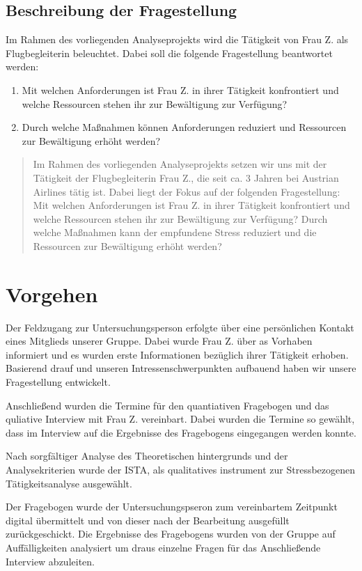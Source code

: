 \documentclass[12pt, a4paper]{article}
\begin{document}
\subsection{Beschreibung der Fragestellung}

Im Rahmen des vorliegenden Analyseprojekts wird die Tätigkeit von Frau Z. als Flugbegleiterin beleuchtet. 
Dabei soll die folgende Fragestellung beantwortet werden:
\begin{enumerate}
    \item Mit welchen Anforderungen ist Frau Z. in ihrer Tätigkeit konfrontiert und
    welche Ressourcen stehen ihr zur Bewältigung zur Verfügung?
    \item Durch welche Maßnahmen können Anforderungen 
    reduziert und Ressourcen zur Bewältigung erhöht werden? 
\end{enumerate}
 
\blockquote{
\tiny
Im Rahmen des vorliegenden Analyseprojekts setzen wir uns mit der Tätigkeit der Flugbegleiterin 
Frau Z., die seit ca. 3 Jahren bei Austrian Airlines tätig ist. Dabei liegt der Fokus auf der folgenden 
Fragestellung:
Mit welchen Anforderungen ist Frau Z. in ihrer Tätigkeit konfrontiert und
welche Ressourcen stehen ihr zur Bewältigung zur Verfügung? Durch welche Maßnahmen kann der empfundene 
Stress reduziert und die Ressourcen zur Bewältigung erhöht werden? }

\section{Vorgehen}

Der Feldzugang zur Untersuchungsperson erfolgte über eine persönlichen Kontakt eines Mitglieds 
unserer Gruppe. Dabei wurde Frau Z. über as Vorhaben informiert und 
es wurden erste Informationen bezüglich ihrer Tätigkeit erhoben. Basierend drauf und 
unseren Intressenschwerpunkten aufbauend haben wir unsere Fragestellung entwickelt. 

Anschließend wurden die Termine für den quantiativen Fragebogen und das quliative Interview 
mit Frau Z. vereinbart. Dabei wurden die Termine so gewählt, dass im Interview auf die Ergebnisse 
des Fragebogens eingegangen werden konnte. 

Nach sorgfältiger Analyse des Theoretischen 
hintergrunds und der Analysekriterien wurde der ISTA, als qualitatives instrument zur 
Stressbezogenen Tätigkeitsanalyse ausgewählt.

Der Fragebogen wurde der Untersuchungspseron zum vereinbartem Zeitpunkt digital übermittelt und 
von dieser nach der Bearbeitung ausgefüllt zurückgeschickt. Die Ergebnisse des Fragebogens wurden 
von der Gruppe auf Auffälligkeiten analysiert um draus einzelne Fragen für das Anschließende 
Interview abzuleiten. 
\end{document}
